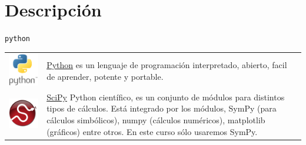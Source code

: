 \documentclass[hyperref={colorlinks=true}]{beamer}
\begin{document}
\section[Descripción]{Descripción}
\begin{frame}{\texttt{python}}
\begin{tabular}{m{.2\linewidth} m{.8\linewidth} }
\includegraphics[scale=.1]{imagenes/python-logo.png} & \href{https://www.python.org/}{Python} es un lenguaje de programación interpretado, abierto, facil de aprender, potente y portable.\\
\includegraphics[scale=1]{imagenes/scipy_logo.png} & \href{http://www.scipy.org/}{SciPy} Python científico, es un conjunto de módulos para distintos tipos de cálculos. Está integrado por los módulos, SymPy (para cálculos simbólicos), numpy (cálculos numéricos), matplotlib (gráficos) entre otros.  En este curso sólo usaremos SymPy.\\
\end{tabular}
\end{frame}
\end{document}
